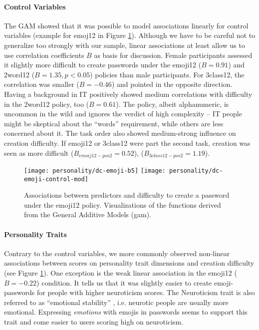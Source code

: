 \paragraph{Control Variables} 
The GAM showed that it was possible to model associations linearly for control variables (example for emoj12 in Figure \ref{fig:personality:dc-emoji-b5}). Although we have to be careful not to generalize too strongly with our sample, linear associations at least allow us to use correlation coefficients $B$ as basis for discussion.
Female participants assessed it slightly more difficult to create passwords under the emoji12 ($B=0.91$) and 2word12 ($B=1.35, p<0.05$) policies than male participants. For 3class12, the correlation was smaller ($B=-0.46$) and pointed in the opposite direction. 
Having a background in IT positively showed medium correlations with difficulty in the 2word12 policy, too ($B=0.61$). The policy, albeit alphanumeric, is uncommon in the wild and ignores the verdict of high complexity -- IT people might be skeptical about the ``words'' requirement, while others are less concerned about it.
The task order also showed medium-strong influence on creation difficulty. If emoji12 or 3class12 were part the second task, creation was seen as more difficult ($B_{emoij12-pos2}=0.52$),  ($B_{3class12-pos2}=1.19$). 


\begin{figure}
\texttt{[image: personality/dc-emoji-b5]}
\texttt{[image: personality/dc-emoji-control-mod]}
\caption{\label{fig:personality:dc-emoji-b5}Associations between predictors and difficulty to create a password under the emoji12 policy. Visualizations of the functions derived from the General Additive Models (gam).}
\end{figure}
\paragraph{Personality Traits}
Contrary to the control variables, we more commonly observed non-linear associations between scores on personality trait dimensions and creation difficulty (see Figure \ref{fig:personality:dc-emoji-b5}).
One exception is the weak linear association in the emoji12 ($B=-0.22$) condition. It tells us that it was slightly easier to create emoji-passwords for people with higher neuroticism scores. The Neuroticism trait is also referred to as ``emotional stability'' \cite{Costa1992NEO}, i.e. neurotic people are usually more emotional. Expressing \textit{emotions} with emojis in passwords seems to support this trait and come easier to users scoring high on neuroticism. %


